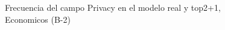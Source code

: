 \begin{figure}[H]
    \centering
    
    \caption{Frecuencia del campo Privacy en el modelo real y top2+1, Economicos (B-2)}
    \label{frecuency-Privacy-top2+1}
\end{figure}